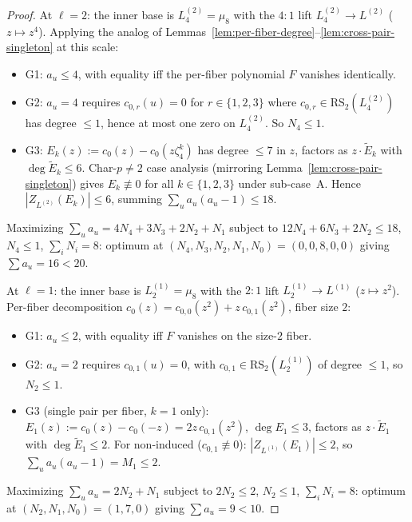 \documentclass[11pt]{article}
\theoremstyle{definition}
\theoremstyle{remark}
\begin{document}
\begin{proof}
At $\ell = 2$: the inner base is $L^{(2)}_4 = \mu_8$ with the $4{:}1$ lift
$L^{(2)}_4 \to L^{(2)}$ ($z \mapsto z^4$). Applying the analog of
Lemmas~\ref{lem:per-fiber-degree}--\ref{lem:cross-pair-singleton} at this
scale:
\begin{itemize}[leftmargin=2em]
\item G1: $a_u \leq 4$, with equality iff the per-fiber polynomial $F$
  vanishes identically.
\item G2: $a_u = 4$ requires $c_{0,r}(u) = 0$ for $r \in \{1, 2, 3\}$ where
  $c_{0,r} \in \mathrm{RS}_2(L^{(2)}_4)$ has degree $\leq 1$, hence at most
  one zero on $L^{(2)}_4$. So $N_4 \leq 1$.
\item G3: $E_k(z) := c_0(z) - c_0(z\zeta_4^k)$ has degree $\leq 7$ in
  $z$, factors as $z \cdot \tilde E_k$ with $\deg \tilde E_k \leq 6$.
  Char-$p \neq 2$ case analysis (mirroring
  Lemma~\ref{lem:cross-pair-singleton}) gives $E_k \not\equiv 0$ for all
  $k \in \{1, 2, 3\}$ under sub-case~A. Hence $|Z_{L^{(2)}}(E_k)| \leq 6$,
  summing $\sum_u a_u(a_u - 1) \leq 18$.
\end{itemize}
Maximizing $\sum_u a_u = 4N_4 + 3N_3 + 2N_2 + N_1$ subject to
$12 N_4 + 6 N_3 + 2 N_2 \leq 18$, $N_4 \leq 1$, $\sum_i N_i = 8$:
optimum at $(N_4, N_3, N_2, N_1, N_0) = (0, 0, 8, 0, 0)$ giving
$\sum a_u = 16 < 20$.

At $\ell = 1$: the inner base is $L^{(1)}_2 = \mu_8$ with the $2{:}1$ lift
$L^{(1)}_2 \to L^{(1)}$ ($z \mapsto z^2$). Per-fiber decomposition
$c_0(z) = c_{0,0}(z^2) + z\, c_{0,1}(z^2)$, fiber size $2$:
\begin{itemize}[leftmargin=2em]
\item G1: $a_u \leq 2$, with equality iff $F$ vanishes on the size-$2$
  fiber.
\item G2: $a_u = 2$ requires $c_{0,1}(u) = 0$, with
  $c_{0,1} \in \mathrm{RS}_2(L^{(1)}_2)$ of degree $\leq 1$, so $N_2 \leq 1$.
\item G3 (single pair per fiber, $k = 1$ only): $E_1(z) := c_0(z) - c_0(-z)
  = 2 z\, c_{0,1}(z^2)$, $\deg E_1 \leq 3$, factors as $z \cdot \tilde E_1$
  with $\deg \tilde E_1 \leq 2$. For non-induced ($c_{0,1} \not\equiv 0$):
  $|Z_{L^{(1)}}(E_1)| \leq 2$, so $\sum_u a_u(a_u - 1) = M_1 \leq 2$.
\end{itemize}
Maximizing $\sum_u a_u = 2 N_2 + N_1$ subject to $2 N_2 \leq 2$,
$N_2 \leq 1$, $\sum_i N_i = 8$: optimum at $(N_2, N_1, N_0) = (1, 7, 0)$
giving $\sum a_u = 9 < 10$.
\end{proof}
\end{document}
